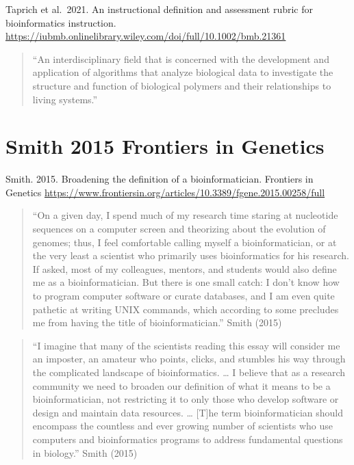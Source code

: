\documentclass[
]{book}
\begin{document}
Taprich et al.~2021. An instructional definition and assessment rubric for bioinformatics instruction. \url{https://iubmb.onlinelibrary.wiley.com/doi/full/10.1002/bmb.21361}

\begin{quote}
``An interdisciplinary field that is concerned with the development and application of algorithms that analyze biological data to investigate the structure and function of biological polymers and their relationships to living systems.''
\end{quote}

\hypertarget{smith-2015-frontiers-in-genetics}{%
\section{Smith 2015 Frontiers in Genetics}\label{smith-2015-frontiers-in-genetics}}

Smith. 2015. Broadening the definition of a bioinformatician. Frontiers in Genetics
\url{https://www.frontiersin.org/articles/10.3389/fgene.2015.00258/full}

\begin{quote}
``On a given day, I spend much of my research time staring at nucleotide sequences on a computer screen and theorizing about the evolution of genomes; thus, I feel comfortable calling myself a bioinformatician, or at the very least a scientist who primarily uses bioinformatics for his research. If asked, most of my colleagues, mentors, and students would also define me as a bioinformatician. But there is one small catch: I don't know how to program computer software or curate databases, and I am even quite pathetic at writing UNIX commands, which according to some precludes me from having the title of bioinformatician.'' Smith (2015)
\end{quote}

\begin{quote}
``I imagine that many of the scientists reading this essay will consider me an imposter, an amateur who points, clicks, and stumbles his way through the complicated landscape of bioinformatics. \ldots{} I believe that as a research community we need to broaden our definition of what it means to be a bioinformatician, not restricting it to only those who develop software or design and maintain data resources. \ldots{} {[}T{]}he term bioinformatician should encompass the countless and ever growing number of scientists who use computers and bioinformatics programs to address fundamental questions in biology.'' Smith (2015)
\end{quote}
\end{document}
